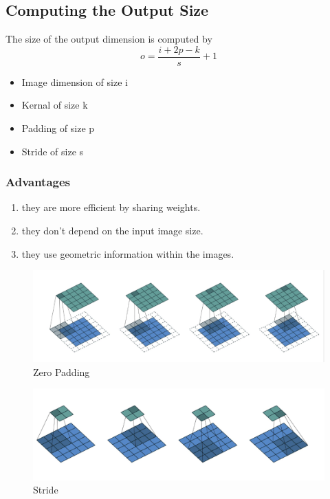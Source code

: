 \documentclass[11pt, english]{article}
\begin{document}
\subsection{Computing the Output Size}
The size of the output dimension is computed by 
\[
o = \frac{i+2p-k}{s}+1
\]
\begin{itemize}
    \item Image dimension of size i
    \item Kernal of size k
    \item Padding of size p
    \item Stride of size s
\end{itemize}
\subsubsection{Advantages}
\begin{enumerate}
    \item they are more efficient by sharing weights.
    \item they don’t depend on the input image size.
    \item they use geometric information within the images.
\end{enumerate}
\begin{figure}[H]
    \centering
    \includegraphics[width=0.75\linewidth]{Zero Padding.png}
    \caption{Zero Padding}
    \label{fig:enter-label}
\end{figure}
\begin{figure}[H]
    \centering
    \includegraphics[width=0.75\linewidth]{Screenshot 2025-01-28 at 7.10.53 PM.png}
    \caption{Stride}
    \label{fig:enter-label}
\end{figure}
\end{document}
